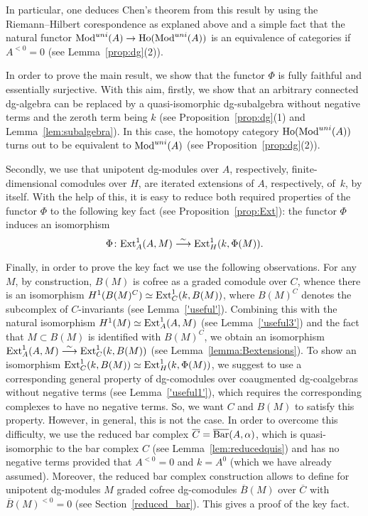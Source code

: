 \documentclass[10pt,russian]{article}
\theoremstyle{plain}
\theoremstyle{definition}
\newcommand{\Barr}{{\rm Bar}}
\newcommand{\Mod}{{\rm Mod}}
\newcommand{\Ext}{{\rm Ext}}
\newcommand{\Ho}{{\rm Ho}}
\begin{document}
In particular, one deduces Chen's theorem from this result by using the Riemann--Hilbert corespondence as explaned above and a simple fact that the natural functor $\Mod^{uni}(A)\to \Ho(\Mod^{uni}(A))$ is an equivalence of categories if~$A^{<0}=0$ (see Lemma~\ref{prop:dg}(2)).


\medskip

In order to prove the main result, we show that the functor $\Phi$ is fully faithful and essentially surjective. With this aim, firstly, we show that an arbitrary connected dg-algebra can be replaced by a quasi-isomorphic dg-subalgebra without negative terms and the zeroth term being $k$ (see Proposition~\ref{prop:dg}(1) and Lemma~\ref{lem:subalgebra}). In this case, the homotopy category $\Ho(\Mod^{uni}(A))$ turns out to be equivalent to $\Mod^{uni}(A)$ (see Proposition~\ref{prop:dg}(2)).

Secondly, we use that unipotent dg-modules over $A$, respectively, finite-dimensional comodules over $H$, are iterated extensions of $A$, respectively, of~$k$, by itself. With the help of this, it is easy to reduce both required properties of the functor $\Phi$ to the following key fact (see Proposition~\ref{prop:Ext}): the functor $\Phi$ induces an isomorphism
$$
{\Phi\colon\Ext_A^1(A, M)\stackrel{\sim}\longrightarrow\Ext_H^1(k,\Phi(M))}.
$$
	
Finally, in order to prove the key fact we use the following observations. For any $M$, by construction, $B(M)$ is cofree as a graded comodule over $C$, whence there is an isomorphism $H^1(B(M)^C)\simeq \Ext^1_C(k,B(M))$, where $B(M)^C$ denotes the subcomplex of $C$-invariants (see Lemma~\ref{'useful'}). Combining this with the natural isomorphism $H^1(M)\simeq \Ext^1_A(A,M)$ (see Lemma~\ref{'useful3'}) and the fact that $M\subset B(M)$ is identified with $B(M)^C$, we obtain an isomorphism $\Ext^1_A(A,M)\stackrel{\sim}\longrightarrow \Ext^1_C(k,B(M))$ (see Lemma~\ref{lemma:Bextensions}). To show an isomorphism $\Ext^1_C(k,B(M))\simeq \Ext^1_H(k,\Phi(M))$, we suggest to use a corresponding general property of dg-comodules over coaugmented dg-coalgebras without negative terms (see Lemma~\ref{'useful1'}), which requires the corresponding complexes to have no negative terms. So, we want $C$ and $B(M)$ to satisfy this property. However, in general, this is not the case. In order to overcome this difficulty, we use the reduced bar complex $\overline{C}=\overline{\Barr}(A,\alpha)$, which is quasi-isomorphic to the bar complex $C$ (see Lemma~\ref{lem:reducedquis}) and has no negative terms provided that $A^{<0}=0$ and $k=A^0$ (which we have already assumed). Moreover, the reduced bar complex construction allows to define  for unipotent dg-modules $M$ graded cofree dg-comodules $\overline{B}(M)$ over $\overline{C}$ with $\overline{B}(M)^{<0}=0$ (see Section~\ref{reduced_bar}). This gives a proof of the key fact.
\end{document}
